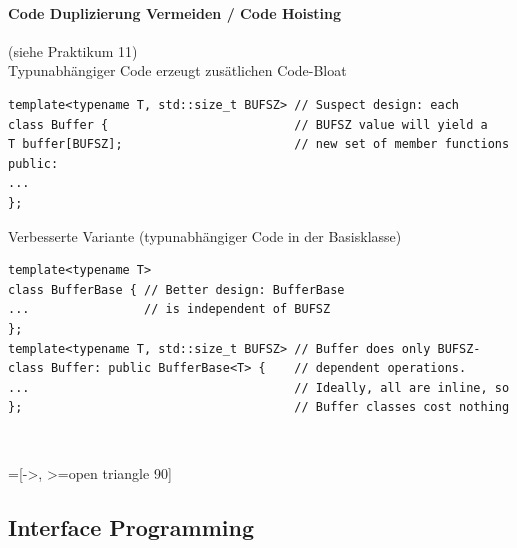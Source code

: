 \paragraph{Code Duplizierung Vermeiden / Code Hoisting} (siehe Praktikum 11)
\\
Typunabhängiger Code erzeugt zusätlichen Code-Bloat
\begin{lstlisting}
template<typename T, std::size_t BUFSZ> // Suspect design: each
class Buffer {                          // BUFSZ value will yield a
T buffer[BUFSZ];                        // new set of member functions
public:
...
};
\end{lstlisting}

\begin{minipage}{15cm}
Verbesserte Variante (typunabhängiger Code in der Basisklasse)
\begin{lstlisting}
template<typename T>
class BufferBase { // Better design: BufferBase
...                // is independent of BUFSZ
};
template<typename T, std::size_t BUFSZ> // Buffer does only BUFSZ-
class Buffer: public BufferBase<T> {    // dependent operations.
...                                     // Ideally, all are inline, so
};                                      // Buffer classes cost nothing
\end{lstlisting}
\end{minipage}~
\begin{minipage}{3cm}
=[->, >=open triangle 90]
\end{minipage}

\subsection{Interface Programming}


